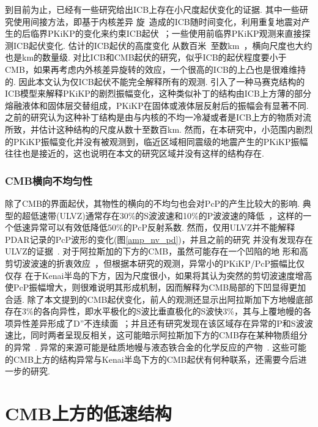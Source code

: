 到目前为止，已经有一些研究给出ICB上存在小尺度起伏变化的证据. 其中一些研究使用间接方法，即基于内核差异
旋~\citep{Song1996}造成的ICB随时间变化，利用重复地震对产生的后临界PKiKP的变化来约束ICB起伏~\citep{Wen2006}；一些使用前临界PKiKP观测来直接探测ICB起伏变化\citep{Dai2012}. 估计的ICB起伏的高度变化
从数百米~\citep{Cao2007}至数km~\citep{Dai2012}，横向尺度也大约也是km的数量级. 对比ICB和CMB起伏的研究，似乎ICB的起伏程度要小于CMB，如果再考虑内外核差异旋转的效应，一个很高的ICB的上凸也是很难维持的. 因此本文认为仅ICB起伏不能完全解释所有的观测. \citet{Krasnoshchekov2005}引入了一种马赛克结构的ICB模型来解释PKiKP的剧烈振幅变化，这种类似补丁的结构由ICB上方薄的部分熔融液体和固体层交替组成，PKiKP在固体或液体层反射后的振幅会有显著不同. 之前的研究认为这种补丁结构是由与内核的不均一冷凝或者是ICB上方的物质对流所致，并估计这种结构的尺度从数十至数百km. 然而，在本研究中，小范围内剧烈的PKiKP振幅变化并没有被观测到，临近区域相同震级的地震产生的PKiKP振幅往往也是接近的，这也说明在本文的研究区域并没有这样的结构存在. 

\subsubsection{CMB横向不均匀性}

除了CMB的界面起伏，其物性的横向的不均匀也会对PcP的产生比较大的影响. 典型的超低速带(ULVZ)通常存在30\%的S波波速和10\%的P波波速的降低~\citep{Thorne2004a}，这样的一个低速异常可以有效低降低50\%的PcP反射系数. 然而，仅用ULVZ并不能解释PDAR记录的PcP波形的变化(图\ref{amp_nv_pd})，并且之前的研究
并没有发现存在ULVZ的证据~\citep{Havens2001a}. 对于阿拉斯加的下方的CMB，虽然可能存在一个凹陷的地
形和高剪切波波速的折衷效应~\citep{Castle2000}，但根据本研究的观测，异常小的PKiKP/PcP振幅比仅仅存
在于Kenai半岛的下方，因为尺度很小，如果将其认为突然的剪切波速度增高使PcP振幅增大，则很难说明其形成机制，因而解释为CMB局部的下凹显得更加合适. 除了本文提到的CMB起伏变化，前人的观测还显示出阿拉斯加下方地幔底部存在3\%的各向异性，即水平极化的S波比垂直极化的S波快3\%，其与上覆地幔的各项异性差异形成了D''不连续面~\citep{Matzel1996a}；并且还有研究发现在该区域存在异常的P和S波波速比，同时两者呈现反相关，这可能暗示阿拉斯加下方的CMB存在某种物质组分的异常~\citep{Wysession1999a}. 异常的来源可能是硅质地幔与液态铁合金的化学反应的产物~\citep{Jeanloz1993a}. 这些可能的CMB上方的结构异常与Kenai半岛下方的CMB起伏有何种联系，还需要今后进一步的研究.

\section{CMB上方的低速结构}

